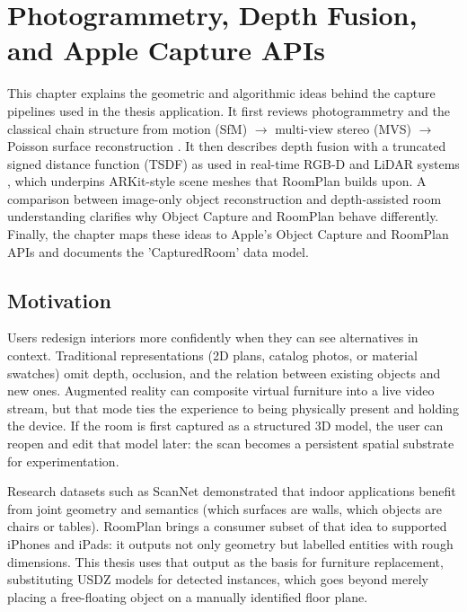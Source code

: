 \chapter{Photogrammetry, Depth Fusion, and Apple Capture APIs}
\label{ch:theory1}

This chapter explains the geometric and algorithmic ideas behind the capture pipelines used in the thesis application. It first reviews photogrammetry and the classical chain structure from motion (SfM) $\rightarrow$ multi-view stereo (MVS) $\rightarrow$ Poisson surface reconstruction \cite{luhmann2014photogrammetry,lowe2004sift,furukawa2010pmvs,kazhdan2006poisson}. It then describes depth fusion with a truncated signed distance function (TSDF) as used in real-time RGB-D and LiDAR systems \cite{newcombe2011kinectfusion}, which underpins ARKit-style scene meshes that RoomPlan builds upon. A comparison between image-only object reconstruction and depth-assisted room understanding clarifies why Object Capture and RoomPlan behave differently. Finally, the chapter maps these ideas to Apple's Object Capture and RoomPlan APIs and documents the 'CapturedRoom' data model.


\section{Motivation}
\label{sec:motivation}

Users redesign interiors more confidently when they can see alternatives in context. Traditional representations (2D plans, catalog photos, or material swatches) omit depth, occlusion, and the relation between existing objects and new ones. Augmented reality can composite virtual furniture into a live video stream, but that mode ties the experience to being physically present and holding the device. If the room is first captured as a structured 3D model, the user can reopen and edit that model later: the scan becomes a persistent spatial substrate for experimentation.

Research datasets such as ScanNet \cite{dai2017scannet} demonstrated that indoor applications benefit from joint geometry and semantics (which surfaces are walls, which objects are chairs or tables). RoomPlan brings a consumer subset of that idea to supported iPhones and iPads: it outputs not only geometry but labelled entities with rough dimensions. This thesis uses that output as the basis for furniture replacement, substituting USDZ models for detected instances, which goes beyond merely placing a free-floating object on a manually identified floor plane.


